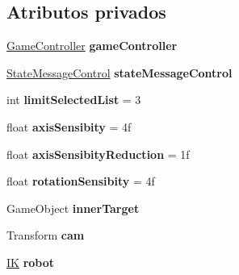 \subsection*{Atributos privados}
\begin{DoxyCompactItemize}
\item 
\mbox{\label{class_selection_control_ab58ba99d0ac60add2848b5fc809e5c3a}} 
\mbox{\hyperlink{class_game_controller}{Game\+Controller}} {\bfseries game\+Controller}
\item 
\mbox{\label{class_selection_control_aff388d8482e51dd5c41c574548e7a5f1}} 
\mbox{\hyperlink{class_state_message_control}{State\+Message\+Control}} {\bfseries state\+Message\+Control}
\item 
\mbox{\label{class_selection_control_acc82727476da9068b9d37626c3970838}} 
int {\bfseries limit\+Selected\+List} = 3
\item 
\mbox{\label{class_selection_control_ab7311557ef2c9005f364e56f05dafb71}} 
float {\bfseries axis\+Sensibity} = 4f
\item 
\mbox{\label{class_selection_control_a55cfc233f1c1b59b942e5214b2700982}} 
float {\bfseries axis\+Sensibity\+Reduction} = 1f
\item 
\mbox{\label{class_selection_control_a8a791541efa5835991e827d607f31bde}} 
float {\bfseries rotation\+Sensibity} = 4f
\item 
\mbox{\label{class_selection_control_ab9e62bdf4cd95d797fe86a3aab18fb79}} 
Game\+Object {\bfseries inner\+Target}
\item 
\mbox{\label{class_selection_control_ab4b3742c71f492fe3b364bdb57684810}} 
Transform {\bfseries cam}
\item 
\mbox{\label{class_selection_control_a5d71202bcab3b91730c9e775c73a96a9}} 
\mbox{\hyperlink{class_i_k}{IK}} {\bfseries robot}
\end{DoxyCompactItemize}


